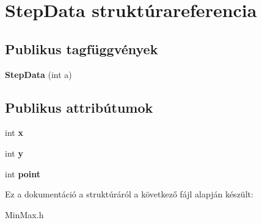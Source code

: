 \hypertarget{struct_step_data}{}\section{Step\+Data struktúrareferencia}
\label{struct_step_data}
\subsection*{Publikus tagfüggvények}
\begin{DoxyCompactItemize}
\item 
\mbox{\label{struct_step_data_a0516e32953276507b2ed8bddefbd4ae3}} 
{\bfseries Step\+Data} (int a)
\end{DoxyCompactItemize}
\subsection*{Publikus attribútumok}
\begin{DoxyCompactItemize}
\item 
\mbox{\label{struct_step_data_aefa0ed317192cac2f30917690c22acdf}} 
int {\bfseries x}
\item 
\mbox{\label{struct_step_data_a5b03c1f161033d79fd2ef22eb7787dbb}} 
int {\bfseries y}
\item 
\mbox{\label{struct_step_data_aeeef49558e20bc633d2b2ddb5c078654}} 
int {\bfseries point}
\end{DoxyCompactItemize}


Ez a dokumentáció a struktúráról a következő fájl alapján készült\+:\begin{DoxyCompactItemize}
\item 
Min\+Max.\+h\end{DoxyCompactItemize}

